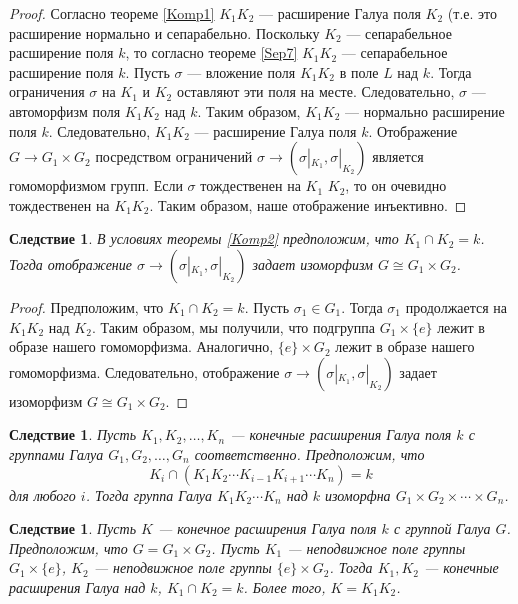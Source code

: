 \documentclass[12pt, titlepage, oneside]{amsbook}
\newtheorem{corollary}[theorem]{Следствие}
\theoremstyle{definition}
\theoremstyle{remark}
\begin{document}
\begin{proof}
Согласно теореме \ref{Komp1} $K_1K_2$ --- расширение Галуа поля $K_2$ (т.е. это расширение нормально и сепарабельно. Поскольку $K_2$ --- сепарабельное расширение поля $k$, то согласно теореме \ref{Sep7} $K_1K_2$ --- сепарабельное расширение поля $k$. Пусть $\sigma$ --- вложение поля $K_1K_2$ в поле $L$ над $k$. Тогда ограничения $\sigma$ на $K_1$ и $K_2$ оставляют эти поля на месте. Следовательно, $\sigma$ --- автоморфизм поля $K_1K_2$ над $k$. Таким образом, $K_1K_2$ --- нормально расширение поля $k$. Следовательно, $K_1K_2$ --- расширение Галуа поля $k$. Отображение $G\rightarrow G_1\times G_2$ посредством ограничений $\sigma\rightarrow(\sigma|_{K_1},\sigma|_{K_2})$ является гомоморфизмом групп. Если $\sigma$ тождественен на $K_1$  $K_2$, то он очевидно тождественен на $K_1K_2$. Таким образом, наше отображение инъективно.
\end{proof}


\begin{corollary}
\label{Komp3}
В условиях теоремы \ref{Komp2} предположим, что $K_1\cap K_2=k$. Тогда отображение $\sigma\rightarrow(\sigma|_{K_1},\sigma|_{K_2})$ задает изоморфизм $G\cong G_1\times G_2$.
\end{corollary}

\begin{proof}
Предположим, что $K_1\cap K_2=k$. Пусть $\sigma_1\in G_1$. Тогда $\sigma_1$ продолжается на $K_1K_2$ над $K_2$. Таким образом, мы получили, что подгруппа $G_1\times\{e\}$ лежит в образе нашего гомоморфизма. Аналогично, $\{e\}\times G_2$ лежит в образе нашего гомоморфизма. Следовательно, отображение $\sigma\rightarrow(\sigma|_{K_1},\sigma|_{K_2})$ задает изоморфизм $G\cong G_1\times G_2$.
\end{proof}

\begin{corollary}
\label{Komp4}
Пусть $K_1,K_2,\ldots,K_n$ --- конечные расширения Галуа поля $k$ с группами Галуа $G_1,G_2,\ldots,G_n$ соответственно. Предположим, что $$K_i\cap (K_1K_2\cdots K_{i-1}K_{i+1}\cdots K_n)=k$$ для любого $i$. Тогда группа Галуа $K_1K_2\cdots K_n$ над $k$ изоморфна $G_1\times G_2\times\cdots\times G_n$.
\end{corollary}

\begin{corollary}
\label{Komp5}
Пусть $K$ --- конечное расширения Галуа поля $k$ с группой Галуа $G$. Предположим, что $G=G_1\times G_2$. Пусть $K_1$ --- неподвижное поле группы $G_1\times \{e\}$, $K_2$ --- неподвижное поле группы $\{e\}\times G_2$. Тогда $K_1,K_2$ --- конечные расширения Галуа над $k$, $K_1\cap K_2=k$. Более того, $K=K_1K_2$.
\end{corollary}
\end{document}
